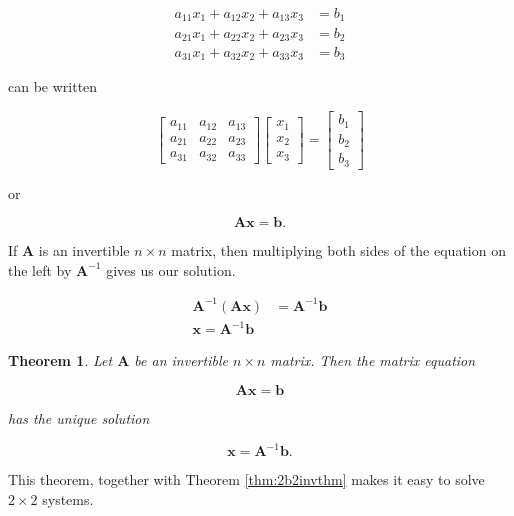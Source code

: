 \documentclass[
]{book}
\newtheorem{theorem}{Theorem}[chapter]
\theoremstyle{definition}
\theoremstyle{definition}
\theoremstyle{definition}
\theoremstyle{definition}
\theoremstyle{remark}
\begin{document}
\begin{align*}
a_{11}x_1+a_{12}x_2+a_{13}x_3&=b_1\\
a_{21}x_1+a_{22}x_2+a_{23}x_3&=b_2\\
a_{31}x_1+a_{32}x_2+a_{33}x_3&=b_3
\end{align*}

can be written

\[\begin{bmatrix}
a_{11}&a_{12}&a_{13}\\a_{21}&a_{22}&a_{23}\\a_{31}&a_{32}&a_{33}
\end{bmatrix}\begin{bmatrix}x_1\\x_2\\x_3\end{bmatrix}=\begin{bmatrix}b_1\\b_2\\b_3\end{bmatrix}\]

or

\[\mathbf{A}\mathbf{x}=\mathbf{b}.\]

If \(\mathbf{A}\) is an invertible \(n\times n\) matrix, then multiplying both sides of the equation on the left by \(\mathbf{A}^{-1}\) gives us our solution.

\begin{align*} 
\mathbf{A}^{-1}(\mathbf{A}\mathbf{x})&=\mathbf{A}^{-1}\mathbf{b}\\
\mathbf{x}=\mathbf{A}^{-1}\mathbf{b}
\end{align*}

\begin{theorembox}

\begin{theorem}
\protect\hypertarget{thm:IMT}{}\label{thm:IMT}Let \(\mathbf{A}\) be an invertible \(n\times n\) matrix. Then the matrix equation

\[\mathbf{A}\mathbf{x}=\mathbf{b}\]

has the unique solution

\[\mathbf{x}=\mathbf{A}^{-1}\mathbf{b}.\]
\end{theorem}

\end{theorembox}

This theorem, together with Theorem \ref{thm:2b2invthm} makes it easy to solve \(2\times 2\) systems.
\end{document}

